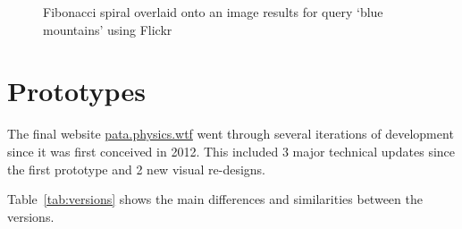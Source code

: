 \begin{figure}[!htbp] %
  \centering
  \caption[Fibonacci image spiral]{Fibonacci spiral overlaid onto an image results for query `blue mountains' using Flickr}
  \label{img:fibspiral}
\end{figure}


\section{Prototypes}
\label{s:prototypes}

The final website \url{pata.physics.wtf} went through several iterations of development since it was first conceived in 2012. This included 3 major technical updates since the first prototype and 2 new visual re-designs.

Table~\ref{tab:versions} shows the main differences and similarities between the versions. 

